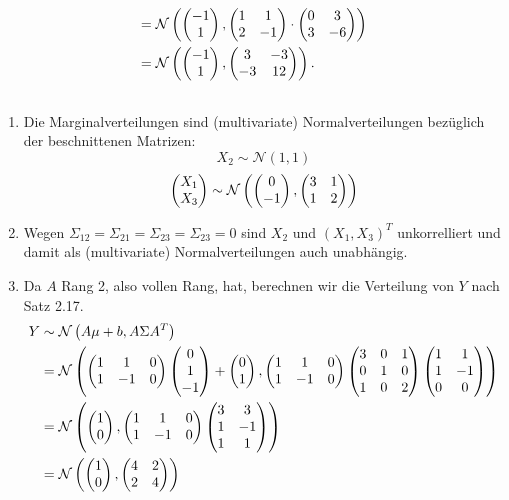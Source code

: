 \documentclass[a4paper]{article}
\begin{document}
\begin{enumerate}
\begin{align*}
        &= \mathcal{N}\left( \left(\begin{matrix}-1 \\ 1\end{matrix}\right), \left(\begin{matrix}1 & 1 \\ 2 & -1\end{matrix}\right) \cdot \left(\begin{matrix}0 & 3 \\ 3 & -6\end{matrix}\right) \right)\\
        &= \mathcal{N}\left( \left(\begin{matrix}-1 \\ 1\end{matrix}\right), \left(\begin{matrix}3 & -3 \\ -3 & 12\end{matrix}\right) \right)\text{.}
    \end{align*}
\end{enumerate}

\subsection{}

\begin{enumerate}
    \item Die Marginalverteilungen sind (multivariate) Normalverteilungen bezüglich der beschnittenen Matrizen:
    \begin{equation*}
        X_2 \sim \mathcal{N}(1, 1)
    \end{equation*}
    \begin{equation*}
        \left(\begin{matrix}X_1 \\ X_3\end{matrix}\right) \sim \mathcal{N}\left(\left(\begin{matrix}0 \\ -1\end{matrix}\right), \left(\begin{matrix}3 & 1 \\ 1 & 2\end{matrix}\right)\right)
    \end{equation*}
    \item Wegen $\Sigma_{12} = \Sigma_{21} = \Sigma_{23} = \Sigma_{23} = 0$ sind $X_2$ und $(X_1, X_3)^T$ unkorrelliert und damit als (multivariate) Normalverteilungen auch unabhängig.
    \item Da $A$ Rang 2, also vollen Rang, hat, berechnen wir die Verteilung von $Y$ nach Satz 2.17.
    \begin{align*}
        Y &\sim \mathcal{N}\left( A \mu + b, A \Sigma A^T \right)\\
        &= \mathcal{N}\left( \left(\begin{matrix}1 & 1 & 0 \\ 1 & -1 & 0\end{matrix}\right) \left(\begin{matrix}0 \\ 1 \\ -1\end{matrix}\right) + \left(\begin{matrix}0 \\ 1\end{matrix}\right), \left(\begin{matrix}1 & 1 & 0 \\ 1 & -1 & 0\end{matrix}\right) \left(\begin{matrix}3 & 0 & 1 \\ 0 & 1 & 0 \\ 1 & 0 & 2\end{matrix}\right) \left(\begin{matrix}1 & 1 \\ 1 & -1 \\ 0 & 0\end{matrix}\right) \right)\\
        &= \mathcal{N}\left( \left(\begin{matrix}1 \\ 0\end{matrix}\right), \left(\begin{matrix}1 & 1 & 0 \\ 1 & -1 & 0\end{matrix}\right) \left(\begin{matrix} 3 & 3 \\ 1 & -1 \\ 1 & 1 \end{matrix}\right) \right)\\
        &= \mathcal{N}\left( \left(\begin{matrix}1 \\ 0\end{matrix}\right), \left(\begin{matrix}4 & 2 \\ 2 & 4\end{matrix}\right) \right)
    \end{align*}
\end{enumerate}
\end{document}
